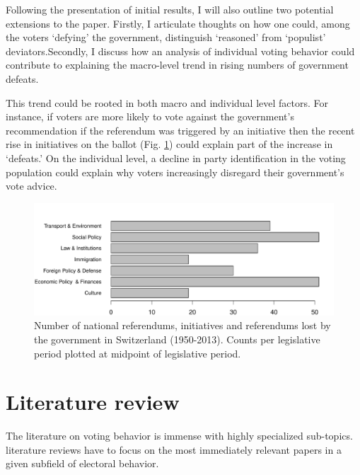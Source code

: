 \documentclass[11pt,a4paper]{article}\usepackage[]{graphicx}\usepackage[]{color}
\makeatletter
\def\maxwidth{ %
  \ifdim\Gin@nat@width>\linewidth
    \linewidth
  \else
    \Gin@nat@width
  \fi
}
\newenvironment{knitrout}{}{} %
\makeatother
\begin{document}
    Following the presentation of initial results, I will also outline two potential extensions to the paper. Firstly, I articulate thoughts on how one could, among the voters `defying' the government, distinguish `reasoned' from `populist' deviators.Secondly, I discuss how an analysis of individual voting behavior could contribute to explaining the macro-level trend in rising numbers of government defeats. 
    
    This trend could be rooted in both macro and individual level factors. For instance, if voters are more likely to vote against the government's recommendation if the referendum was triggered by an initiative then the recent rise in initiatives on the ballot (Fig. \ref{fig}) could explain part of the increase in `defeats.' On the individual level, a decline in party identification in the voting population could explain why voters increasingly disregard their government's vote advice.

\begin{figure}[!htb]
\centering
\begin{knitrout}
\color{fgcolor}
\includegraphics[width=\maxwidth]{figure/unnamed-chunk-1-1} 

\end{knitrout}
\caption{Number of national referendums, initiatives and referendums lost by the government in Switzerland (1950-2013). Counts per legislative period plotted at midpoint of legislative period.}\label{fig}
\end{figure}

\section{Literature review}\label{sec:litreview}

	The literature on voting behavior is immense with highly specialized sub-topics. literature reviews have to focus on the most immediately relevant papers in a given subfield of electoral behavior. 
	
\end{document}
